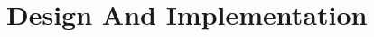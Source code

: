 \documentclass[Main]{subfiles}
\begin{document}
\section{Design And Implementation} %
\label{sec:design_and_implementation}

\end{document}
